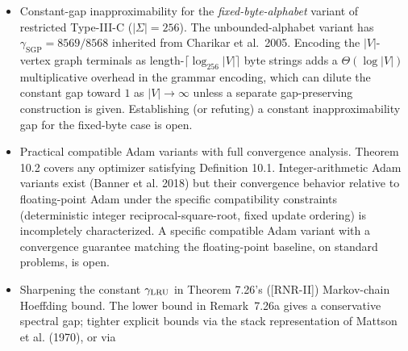 \documentclass[
]{article}
\begin{document}
\begin{itemize}
  \emph{Conjecture 4.3e (Varying-parameter $E_{12}$ constant-gap
  inapproximability).} We conjecture that there exists a constant
  $\varepsilon > 0$ such that the varying-parameter $E_{12}$
  learned-code labeling problem is NP-hard to approximate within
  factor $1 + \varepsilon$. Motivation: Remark 4.3c proves
  NP-hardness with vanishing gap $1 + 1/(n-1)$; analogous
  combinatorial problems (NCP per Arora-Babai-Stern-Sweedyk 1997,
  CVP per Dinur-Kindler-Raz-Safra 2003) admit constant-gap
  inapproximability via PCP-style gap amplification, suggesting
  that a similar argument may apply to $E_{12}$ once a suitable
  source problem with the right structural properties is identified.
  The conjecture is restricted to the \emph{varying-parameter} case
  (both $n$ and $m$ part of the input); the fixed practical instance
  $n = 256$, $m = 12$ is constant-size and not asymptotically
  NP-hard. A PTAS for varying-parameter $E_{12}$ (polynomial-time
  $(1 + \varepsilon)$-approximation for every $\varepsilon > 0$)
  would refute this conjecture.
\item
  Constant-gap inapproximability for the \emph{fixed-byte-alphabet}
  variant of restricted Type-III-C ($|\Sigma| = 256$). The
  unbounded-alphabet variant has $\gamma_{\mathrm{SGP}} = 8569/8568$
  inherited from Charikar et al.\ 2005. Encoding the
  $|V|$-vertex graph terminals as length-$\lceil \log_{256}|V| \rceil$
  byte strings adds a $\Theta(\log |V|)$ multiplicative overhead in
  the grammar encoding, which can dilute the constant gap toward
  $1$ as $|V| \to \infty$ unless a separate gap-preserving
  construction is given. Establishing (or refuting) a constant
  inapproximability gap for the fixed-byte case is open.
\item
  Practical compatible Adam variants with full convergence
  analysis. Theorem 10.2 covers any optimizer satisfying Definition
  10.1. Integer-arithmetic Adam variants exist (Banner et al. 2018)
  but their convergence behavior relative to floating-point Adam
  under the specific compatibility constraints (deterministic
  integer reciprocal-square-root, fixed update ordering) is
  incompletely characterized. A specific compatible Adam variant
  with a convergence guarantee matching the floating-point
  baseline, on standard problems, is open.
\item
  Sharpening the constant $\gamma_{\rm LRU}$ in Theorem 7.26's ([RNR-II])
  Markov-chain Hoeffding bound. The lower bound in
  Remark~7.26a gives a conservative spectral gap; tighter explicit bounds via the
  stack representation of Mattson et al. (1970), or via

\end{itemize}
\end{document}
